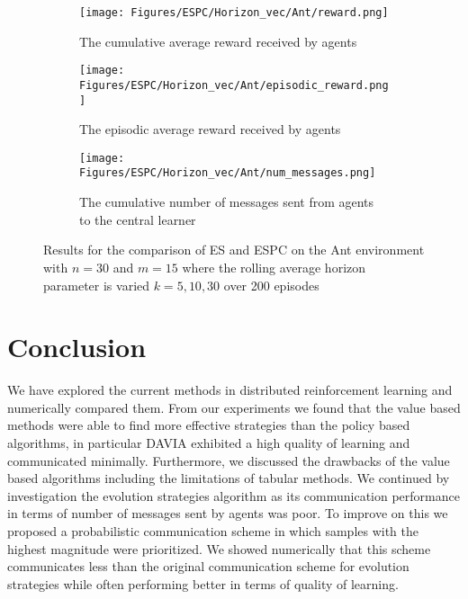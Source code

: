 \begin{figure}
    \centering
    \begin{subfigure}{0.5\textwidth}
        \centering
        \texttt{[image: Figures/ESPC/Horizon\_vec/Ant/reward.png]}
        \caption{The cumulative average reward received by agents}
        \label{fig:AntHorizonReward}
    \end{subfigure}
    \begin{subfigure}{0.5\textwidth}
        \centering
        \texttt{[image: Figures/ESPC/Horizon\_vec/Ant/episodic\_reward.png]}
        \caption{The episodic average reward received by agents}
        \label{fig:AntHorizonEpisodicReward}
    \end{subfigure}
    \begin{subfigure}{0.5\textwidth}
        \centering
        \texttt{[image: Figures/ESPC/Horizon\_vec/Ant/num\_messages.png]}
        \caption{The cumulative number of messages sent from agents to the central learner}
        \label{fig:AntHorizonMessages}
    \end{subfigure}
    \caption{Results for the comparison of ES and ESPC on the Ant environment with $n=30$ and $m=15$ where the rolling average horizon parameter is varied $k=5,10,30$ over 200 episodes}
    \label{fig:AntHorizon}
\end{figure}


\section{Conclusion}

We have explored the current methods in distributed reinforcement learning and numerically compared them. From our experiments we found that the value based methods were able to find more effective strategies than the policy based algorithms, in particular DAVIA exhibited a high quality of learning and communicated minimally. Furthermore, we discussed the drawbacks of the value based algorithms including the limitations of tabular methods. We continued by investigation the evolution strategies algorithm as its communication performance in terms of number of messages sent by agents was poor. To improve on this we proposed a probabilistic communication scheme in which samples with the highest magnitude were prioritized. We showed numerically that this scheme communicates less than the original communication scheme for evolution strategies while often performing better in terms of quality of learning.

